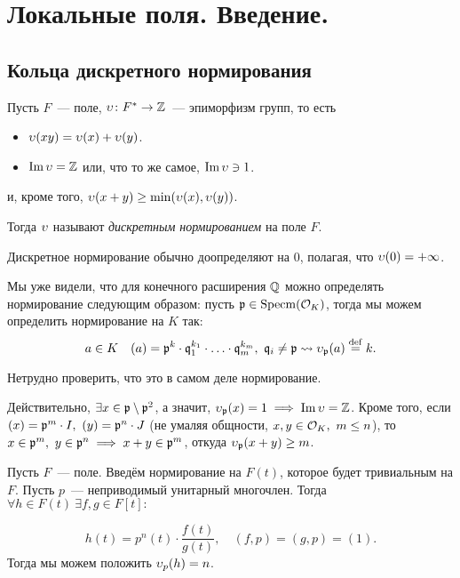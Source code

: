    \section{Локальные поля. Введение. }
    
	\subsection{Кольца дискретного нормирования}

	\begin{definition} 
		Пусть $F$~--- поле, $\upsilon\colon F^{*} \to \mathbb{Z}$~--- эпиморфизм групп, то есть 
		\begin{itemize}
			\item $\upsilon(xy) = \upsilon(x) + \upsilon(y)$.
			\item $\mathop{\mathrm{Im}}\nolimits{\upsilon} = \mathbb{Z}$ или, что то же самое, $\mathop{\mathrm{Im}}\nolimits{\upsilon} \ni 1$.
		\end{itemize}
		и, кроме того, $\upsilon(x + y) \ge \min(\upsilon(x), \upsilon(y))$.

		Тогда $\upsilon$ называют \emph{дискретным нормированием} на поле $F$. 
	\end{definition}

	\begin{remark}
		Дискретное нормирование обычно доопределяют на $0$, полагая, что $\upsilon(0) = +\infty$. 
	\end{remark}

	\begin{example}
		Мы уже видели, что для конечного расширения $\mathbb{Q}$ можно определять нормирование следующим образом: пусть $\mathfrak{p} \in \operatorname{Specm}(\mathcal{O}_{K})$, тогда мы можем определить нормирование на $K$ так: 
		\[
			a \in K \quad (a) = \mathfrak{p}^{k} \cdot \mathfrak{q}_{1}^{k_1} \cdot \ldots \cdot \mathfrak{q}_{m}^{k_m}, \ \mathfrak{q}_i \neq \mathfrak{p} \rightsquigarrow \upsilon_{\mathfrak{p}}(a) \stackrel{\mathrm{def}}{=} k.
		\]

		Нетрудно проверить, что это в самом деле нормирование. 

		Действительно, $\exists x \in \mathfrak{p} \setminus \mathfrak{p}^2$, а значит, $\upsilon_{\mathfrak{p}}(x) = 1 \implies \mathop{\mathrm{Im}}\nolimits{\upsilon} = \mathbb{Z}$. Кроме того, если $(x) = \mathfrak{p}^m \cdot I, \ (y) = \mathfrak{p}^n \cdot J$ (не умаляя общности, $x, y \in \mathcal{O}_{K}, \ m \le n$), то $x \in \mathfrak{p}^m, \ y \in \mathfrak{p}^n \implies x + y \in \mathfrak{p}^{m}$, откуда $\upsilon_{\mathfrak{p}}(x + y) \ge m$. 
	\end{example}

	\begin{example}
		Пусть $F$~--- поле. Введём нормирование на $F(t)$, которое будет тривиальным на $F$. Пусть $p$~--- неприводимый унитарный многочлен. Тогда $\forall h \in F(t) \ \exists f, g \in F[t]\colon$

		\[
			h(t) = p^n(t) \cdot \frac{f(t)}{g(t)}, \quad (f, p) = (g, p) = (1).
		\]
		Тогда мы можем положить $\upsilon_{p}(h) = n$.
	\end{example}


